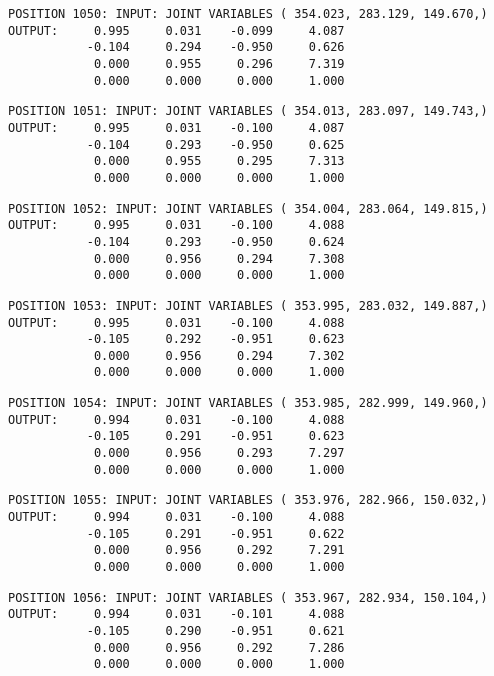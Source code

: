 \begin{verbatim}
POSITION 1050: INPUT: JOINT VARIABLES ( 354.023, 283.129, 149.670,)
OUTPUT:     0.995     0.031    -0.099     4.087
           -0.104     0.294    -0.950     0.626
            0.000     0.955     0.296     7.319
            0.000     0.000     0.000     1.000
\end{verbatim} \pagebreak[1]\begin{verbatim}
POSITION 1051: INPUT: JOINT VARIABLES ( 354.013, 283.097, 149.743,)
OUTPUT:     0.995     0.031    -0.100     4.087
           -0.104     0.293    -0.950     0.625
            0.000     0.955     0.295     7.313
            0.000     0.000     0.000     1.000
\end{verbatim} \pagebreak[1]\begin{verbatim}
POSITION 1052: INPUT: JOINT VARIABLES ( 354.004, 283.064, 149.815,)
OUTPUT:     0.995     0.031    -0.100     4.088
           -0.104     0.293    -0.950     0.624
            0.000     0.956     0.294     7.308
            0.000     0.000     0.000     1.000
\end{verbatim} \pagebreak[1]\begin{verbatim}
POSITION 1053: INPUT: JOINT VARIABLES ( 353.995, 283.032, 149.887,)
OUTPUT:     0.995     0.031    -0.100     4.088
           -0.105     0.292    -0.951     0.623
            0.000     0.956     0.294     7.302
            0.000     0.000     0.000     1.000
\end{verbatim} \pagebreak[1]\begin{verbatim}
POSITION 1054: INPUT: JOINT VARIABLES ( 353.985, 282.999, 149.960,)
OUTPUT:     0.994     0.031    -0.100     4.088
           -0.105     0.291    -0.951     0.623
            0.000     0.956     0.293     7.297
            0.000     0.000     0.000     1.000
\end{verbatim} \pagebreak[1]\begin{verbatim}
POSITION 1055: INPUT: JOINT VARIABLES ( 353.976, 282.966, 150.032,)
OUTPUT:     0.994     0.031    -0.100     4.088
           -0.105     0.291    -0.951     0.622
            0.000     0.956     0.292     7.291
            0.000     0.000     0.000     1.000
\end{verbatim} \pagebreak[1]\begin{verbatim}
POSITION 1056: INPUT: JOINT VARIABLES ( 353.967, 282.934, 150.104,)
OUTPUT:     0.994     0.031    -0.101     4.088
           -0.105     0.290    -0.951     0.621
            0.000     0.956     0.292     7.286
            0.000     0.000     0.000     1.000
\end{verbatim} \pagebreak[1]\begin{verbatim}

\end{verbatim}
